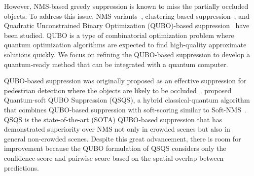 However, NMS-based greedy suppression is known to miss the partially occluded objects.
To address this issue, NMS variants~\cite{bodla2017snms,He2019SofterNMS,Liu2019AdaNMS,Nils2020vgnms,Huang2020VFGNMS,shepley2023confluence}, clustering-based suppression~\cite{ShenJXLK22CPCluster}, and Quadratic Unconstrained Binary Optimization (QUBO)-based suppression~\cite{rujikietgumjorn2013qubo,li2020qsqs} have been studied.
QUBO is a type of combinatorial optimization problem where quantum optimization algorithms are expected to find high-quality approximate solutions quickly.
We focus on refining the QUBO-based suppression to develop a quantum-ready method that can be integrated with a quantum computer.

QUBO-based suppression was originally proposed as an effective suppression for pedestrian detection where the objects are likely to be occluded~\cite{rujikietgumjorn2013qubo}.
\citet{li2020qsqs} proposed Quantum-soft QUBO Suppression (QSQS), a hybrid classical-quantum algorithm that combines QUBO-based suppression with soft-scoring similar to Soft-NMS~\cite{bodla2017snms}. %
QSQS is the state-of-the-art (SOTA) QUBO-based suppression that has demonstrated superiority over NMS not only in crowded scenes but also in general non-crowded scenes.
Despite this great advancement, there is room for improvement because the QUBO formulation of QSQS considers only the confidence score and pairwise score based on the spatial overlap between predictions.


